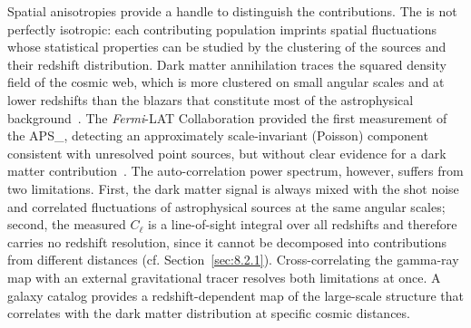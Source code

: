 Spatial anisotropies provide a handle to distinguish the contributions.
The \UGRB is not perfectly isotropic: each contributing population imprints spatial fluctuations whose statistical properties can be studied by the clustering of the sources and their redshift distribution.
Dark matter annihilation traces the squared density field of the cosmic web, which is more clustered on small angular scales and at lower redshifts than the blazars that constitute most of the astrophysical background~\cite{Ando:2005xg,Fermi-LAT:2012pez}. The \textit{Fermi}-LAT Collaboration provided the first measurement of the \UGRB \gls{APS_}, detecting an approximately scale-invariant (Poisson) component consistent with unresolved point sources, but without clear evidence for a dark matter contribution~\cite{Fermi-LAT:2012pez}.
The auto-correlation power spectrum, however, suffers from two limitations. First, the dark matter signal is always mixed with the shot noise and correlated fluctuations of astrophysical sources at the same angular scales; second, the measured $C_\ell$ is a line-of-sight integral over all redshifts and therefore carries no redshift resolution, since it cannot be decomposed into contributions from different distances (cf. Section~\ref{sec:8.2.1}).
Cross-correlating the gamma-ray map with an external gravitational tracer resolves both limitations at once.
A galaxy catalog provides a redshift-dependent map of the large-scale structure that correlates with the dark matter distribution at specific cosmic distances.
